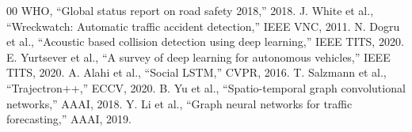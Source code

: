 \documentclass[conference]{IEEEtran}
\begin{document}
\begin{thebibliography}{00}
 WHO, ``Global status report on road safety 2018,'' 2018.
 J. White et al., ``Wreckwatch: Automatic traffic accident detection,'' IEEE VNC, 2011.
 N. Dogru et al., ``Acoustic based collision detection using deep learning,'' IEEE TITS, 2020.
 E. Yurtsever et al., ``A survey of deep learning for autonomous vehicles,'' IEEE TITS, 2020.
 A. Alahi et al., ``Social LSTM,'' CVPR, 2016.
 T. Salzmann et al., ``Trajectron++,'' ECCV, 2020.
 B. Yu et al., ``Spatio-temporal graph convolutional networks,'' AAAI, 2018.
 Y. Li et al., ``Graph neural networks for traffic forecasting,'' AAAI, 2019.
\end{thebibliography}
\end{document}
